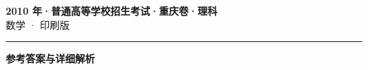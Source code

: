 \documentclass[zihao=5, a4paper]{ctexart}
\begin{document}
\begin{center}
  {\Large\bfseries 2010 年·普通高等学校招生考试·重庆卷·理科}\\[4pt]
  {\large 数学 · 印刷版}
\end{center}
\medskip
{}

\par\bigskip\hrule\bigskip
{}
\begin{center}{\large\bfseries 参考答案与详细解析}\end{center}
\smallskip

\end{document}
